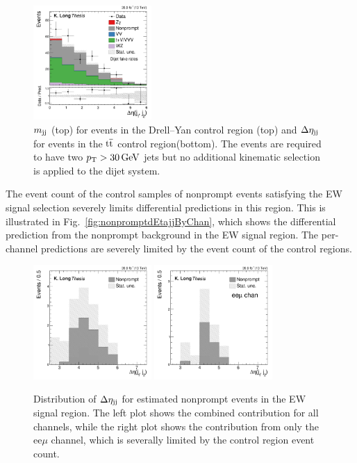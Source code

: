 \begin{figure}[htbp]
   \includegraphics[width=0.4\textwidth]{figures/AnalysisProcedure/dEtajj_3lTTbarControl_dijetFRs.pdf}
  \caption{
    $m_{\mathrm{jj}}$ (top) for events in the Drell--Yan control region (top)
    and $\Delta\eta_{\mathrm{jj}}$ for events in the ${\mathrm{t}\overline{\mathrm{t}}}$ control region(bottom).
    The events are required to have two $p_{\mathrm{T}} > 30\,\text{Ge\hspace{-.08em}V}$
    jets but no additional kinematic selection is applied to the dijet system.
        }
 \label{fig:fakeRates2D}
\end{figure}

The event count of the control samples of nonprompt events
satisfying the EW signal selection severely limits
differential predictions in this region. This is illustrated in 
Fig.~\ref{fig:nonpromptdEtajjByChan}, which shows the differential
prediction from the nonprompt background in the EW signal region.
The per-channel predictions are severely limited by the event count
of the control regions.

\begin{figure}[htbp]
  \centering
   \includegraphics[width=0.4\textwidth]{figures/AnalysisProcedure/dEtajj_nonprompt.pdf}
   \includegraphics[width=0.4\textwidth]{figures/AnalysisProcedure/dEtajj_nonprompt_eem.pdf}
  \caption{
    Distribution of $\Delta\eta_{\mathrm{jj}}$ for estimated nonprompt events in the EW signal region. The
    left plot shows the combined contribution for all channels, while the right plot shows
    the contribution from only the ee$\mu$ channel, which is severally limited by the 
    control region event count. 
        }
 \label{fig:fakeRates2D}
\end{figure}

